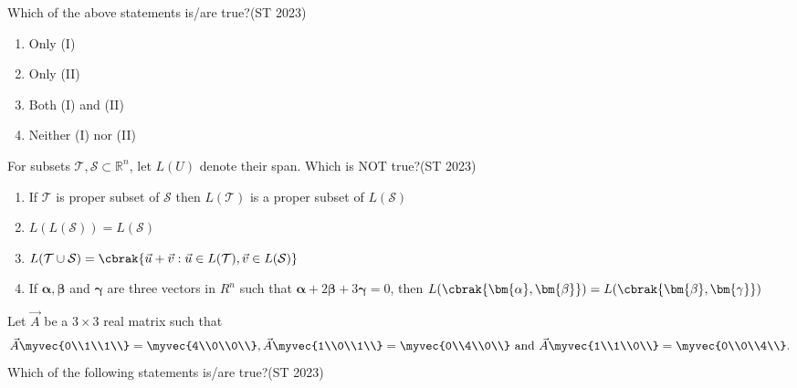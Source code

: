 Which of the above statements is/are true?\hfill(ST 2023)
	\begin{multicols}{2}
\begin{enumerate}
\item Only (I)
\item Only (II)
\item Both (I) and (II)
\item Neither (I) nor (II)
\end{enumerate}
\end{multicols}
\item For subsets $\mathcal{T}, \mathcal{S} \subset \mathbb{R}^n$, let $L(U)$ denote their span. Which is NOT true?\hfill(ST 2023)
\begin{enumerate}
\item If $\mathcal{T}$ is proper subset of $\mathcal{S}$ then $L(\mathcal{T})$ is a proper subset of $L(\mathcal{S})$
\item $L(L(\mathcal{S})) = L(\mathcal{S})$
\item $L(\mathcal{T} \cup \mathcal{S}) = \cbrak{\vec{u}+\vec{v} : \vec{u} \in L(\mathcal{T}), \vec{v} \in L(\mathcal{S})}$
\item If $\bm{\alpha},\bm{\beta}$ and $\bm{\gamma}$ are three vectors in $R^n$ such that $\bm{\alpha}+2\bm{\beta}+3\bm{\gamma}=0$, then $L(\cbrak{\bm{\alpha},\bm{\beta}}) = L(\cbrak{\bm{\beta},\bm{\gamma}})$
\end{enumerate}
\item Let $\vec{A}$ be a $3\times 3$ real matrix such that
	\[
\vec{A}\myvec{0\\1\\1\\} = \myvec{4\\0\\0\\},
\vec{A}\myvec{1\\0\\1\\} = \myvec{0\\4\\0\\} \text{ and }
\vec{A}\myvec{1\\1\\0\\} = \myvec{0\\0\\4\\}.
\]
Which of the following statements is/are true?\hfill(ST 2023)
